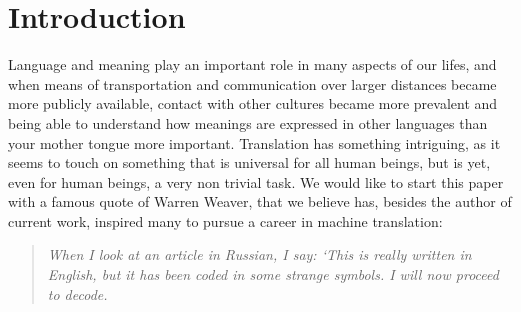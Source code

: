 \documentclass[a4paper, 11pt]{report}
\author{}
\title{}
\theoremstyle{definition}
\theoremstyle{plain}
\begin{document}
\maketitle
\tableofcontents




\chapter{Introduction}



Language and meaning play an important role in many aspects of our lifes, and when means of transportation and communication over larger distances became more publicly available, contact with other cultures became more prevalent and being able to understand how meanings are expressed in other languages than your mother tongue more important. Translation has something intriguing, as it seems to touch on something that is universal for all human beings, but is yet, even for human beings, a very non trivial task. We would like to start this paper with a famous quote of Warren Weaver, that we believe has, besides the author of current work, inspired many to pursue a career in machine translation:

\begin{quote}
\textit{When I look at an article in Russian, I say: `This is really written in English, but it has been coded in some strange symbols. I will now proceed to decode.} \citep{weaver1955translation}
\end{quote}
\end{document}
